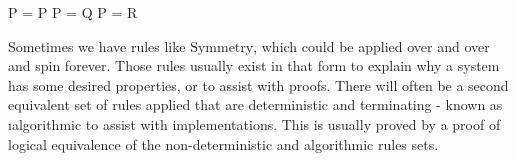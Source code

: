 \begin{frame}[c]
  \begin{mdframed}[frametitle={Equivalence relations}]

  \infrule[Reflexivity]
          {}
          {P = P}
          {P = Q}
          {P = R}
  \end{mdframed}

  \medskip

  \begin{overprint}
  \onslide<+>
  Sometimes we have rules like $\text{Symmetry}$, which could be applied over and over and spin forever.
  \onslide<+>
  Those rules usually exist in that form to explain why a system has some desired properties, or to assist with proofs.
  \onslide<+>
  There will often be a second equivalent set of rules applied that are deterministic and terminating - known as {\i algorithmic} to assist with implementations.
  \onslide<+>
  This is usually proved by a proof of logical equivalence of the non-deterministic and algorithmic rules sets.
  \end{overprint}
\end{frame}

